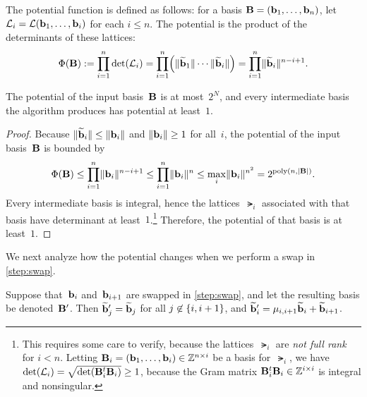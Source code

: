 \documentclass[11pt]{article}
\begin{document}
The potential function is defined as follows: for a basis
$\mathbf{B} = (\mathbf{b}_{1}, \ldots, \mathbf{b}_{n})$, let
$\mathcal{L}_{i} = \mathcal{L}(\mathbf{b}_{1}, \ldots, \mathbf{b}_{i})$ for each $i \leq n$.
The potential is the product of the determinants of these lattices:
\begin{equation}
  \label{eq:potential}
  \Phi(\matB) := \prod_{i=1}^{n} \det(\lat_{i}) = \prod_{i=1}^{n}
  \parens*{\length{\gs{\vecb}_{1}} \cdots \length{\gs{\vecb}_{i}}} =
  \prod_{i=1}^{n} \length{\gs{\vecb}_{i}}^{n-i+1}.
\end{equation}

\begin{claim}
  \label{clm:potential}
  The potential of the input basis~$\mathbf{B}$ is at most~$2^{N}$, and
  every intermediate basis the algorithm produces has potential at
  least~$1$.
\end{claim}

\begin{proof}
  Because $\lVert\widetilde{\mathbf{b}}_{i}\rVert \leq \lVert\mathbf{b}_{i}\rVert$  and
  $\lVert\mathbf{b}_{i}\rVert \geq 1$ for
  all~$i$, the potential of the input basis~$\mathbf{B}$ is bounded by
  \[ \Phi(\mathbf{B}) \leq \prod_{i=1}^{n} \lVert\mathbf{b}_{i}\rVert^{n-i+1} \leq
    \prod_{i=1}^{n} \lVert\mathbf{b}_{i}\rVert^{n} \leq \max_{i}
    \lVert\mathbf{b}_{i}\rVert^{n^{2}} = 2^{\operatorname{poly}(n,\lvert\mathbf{B}\rvert)}. \] Every
  intermediate basis is integral, hence the lattices~$\lat_{i}$
  associated with that basis have determinant at
  least~$1$.\footnote{This requires some care to verify, because the
    lattices~$\lat_{i}$ are \emph{not full rank} for $i < n$. Letting
    $\mathbf{B}_{i} = (\mathbf{b}_{1}, \ldots, \mathbf{b}_{i}) \in \mathbb{Z}^{n \times i}$
    be a basis for~$\lat_{i}$, we have
    $\det(\mathcal{L}_{i}) = \sqrt{\det(\mathbf{B}_{i}^{t} \mathbf{B}_{i})} \geq 1$,
    because the Gram matrix
    $\mathbf{B}_{i}^{t} \mathbf{B}_{i} \in \mathbb{Z}^{i \times i}$ is integral and
    nonsingular.} Therefore, the potential of that basis is at
  least~$1$.
\end{proof}

\noindent We next analyze how the potential changes when we perform a
swap in \cref{step:swap}.

\begin{claim}
  \label{clm:swap-gs}
  Suppose that~$\mathbf{b}_{i}$ and~$\mathbf{b}_{i+1}$ are swapped in
  \cref{step:swap}, and let the resulting basis be denoted~$\mathbf{B}'$.
  Then $\widetilde{\mathbf{b}}'_{j} = \widetilde{\mathbf{b}}_{j}$ for all
  $j \not\in \{i,i+1\}$, and
  $\widetilde{\mathbf{b}}'_{i} = \mu_{i,i+1} \widetilde{\mathbf{b}}_{i} + \widetilde{\mathbf{b}}_{i+1}$.
\end{claim}
\end{document}
